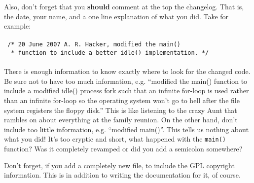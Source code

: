Also, don't forget that you \textbf{should} comment at the top the changelog. That is, the date, your name, and a one line explanation of what you did. Take for example:
\\
\\
\verb| /* 20 June 2007 A. R. Hacker, modified the main()|
\\
\verb|  * function to include a better idle() implementation. */ |
\\
\\
There is enough information to know exactly where to look for the changed code. Be sure not to have too much information, e.g. ``modified the main() function to include a modified idle() process fork such that an infinite for-loop is used rather than an infinite for-loop so the operating system won't go to hell after the file system registers the floppy disk.'' This is like listening to the crazy Aunt that rambles on about everything at the family reunion. On the other hand, don't include too little information, e.g. ``modified main()''. This tells us nothing about what you did! It's too cryptic and short, what happened with the \verb|main()| function? Was it completely revamped or did you add a semicolon somewhere?

Don't forget, if you add a completely new file, to include the GPL copyright information. This is in addition to writing the documentation for it, of course.
